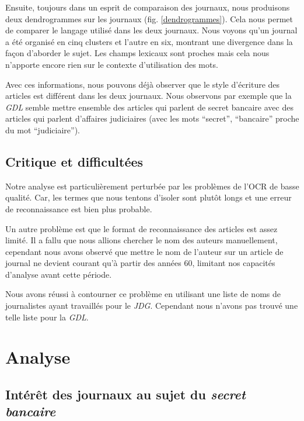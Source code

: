 \documentclass[a4paper, 11pt]{article}
\begin{document}
Ensuite, toujours dans un esprit de comparaison des journaux, nous
produisons deux dendrogrammes sur les journaux (fig. \ref{dendrogrammes}).
Cela nous permet de comparer le langage utilisé dans les deux journaux.
Nous voyons qu'un journal a été organisé en cinq clusters et l'autre en
six, montrant une divergence dans la façon d'aborder le sujet. Les
champs lexicaux sont proches mais cela nous n'apporte encore rien sur le
contexte d'utilisation des mots.

Avec ces informations, nous pouvons déjà observer que le style d'écriture des
articles est différent dans les deux journaux. Nous observons par exemple que la
\emph{GDL} semble mettre ensemble des articles qui parlent de secret bancaire
avec des articles qui parlent d'affaires judiciaires (avec les mots ``secret'',
``bancaire'' proche du mot ``judiciaire'').

\hypertarget{critique-et-difficultuxe9es}{%
\subsection{Critique et
difficultées}\label{critique-et-difficultuxe9es}}

Notre analyse est particulièrement perturbée par les problèmes de l'OCR
de basse qualité. Car, les termes que nous tentons d'isoler sont plutôt
longs et une erreur de reconnaissance est bien plus probable.

Un autre problème est que le format de reconnaissance des articles est
assez limité. Il a fallu que nous allions chercher le nom des auteurs
manuellement, cependant nous avons observé que mettre le nom de l'auteur
sur un article de journal ne devient courant qu'à partir des années 60,
limitant nos capacités d'analyse avant cette période.

Nous avons réussi à contourner ce problème en utilisant une liste de
noms de journalistes ayant travaillés pour le \emph{JDG}. Cependant nous
n'avons pas trouvé une telle liste pour la \emph{GDL}.


\hypertarget{analyse}{%
\section{Analyse}\label{analyse}}

\hypertarget{intuxe9ruxeat-des-journaux-au-sujet-du-secret-bancaire}{%
\subsection{\texorpdfstring{Intérêt des journaux au sujet du
\emph{secret
bancaire}}{Intérêt des journaux au sujet du secret bancaire}}\label{intuxe9ruxeat-des-journaux-au-sujet-du-secret-bancaire}}
\end{document}
